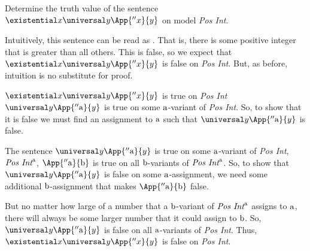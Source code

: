 \begin{majorILnc}{}
	Determine the truth value of the sentence $\existential\variable{x}\universal\variable{y}\App{''\variable{x}}{\variable{y}}$ on model \emph{Pos Int}.
\end{majorILnc}
\begin{PROOF}
	Intuitively, this sentence can be read as .
	That is, there is some positive integer that is greater than all others.
	This is false, so we expect that $\existential\variable{x}\universal\variable{y}\App{''\variable{x}}{\variable{y}}$ is false on \emph{Pos Int}.
	But, as before, intuition is no substitute for proof.

	$\existential\variable{x}\universal\variable{y}\App{''\variable{x}}{\variable{y}}$ is true on \emph{Pos Int} \Iff $\universal\variable{y}\App{''\constant{a}}{\variable{y}}$ is true on some $\mathrm{a}$-variant of \emph{Pos Int}. 
	So, to show that it is false we must find an assignment to $\mathrm{a}$ such that $\universal\variable{y}\App{''\constant{a}}{\variable{y}}$ is false.

	The sentence $\universal\variable{y}\App{''\constant{a}}{\variable{y}}$ is true on some $\mathrm{a}$-variant of \emph{Pos Int}, $\emph{Pos Int}^{\mathrm{a}}$, \Iff $\App{''\constant{a}}{\constant{b}}$ is true on all $\mathrm{b}$-variants of $\emph{Pos Int}^{\mathrm{a}}$.
	So, to show that $\universal\variable{y}\App{''\constant{a}}{\variable{y}}$ is false on some $\mathrm{a}$-assignment, we need some additional $\mathrm{b}$-assignment that makes $\App{''\constant{a}}{\constant{b}}$ false.

	But no matter how large of a number that a $\mathrm{b}$-variant of $\emph{Pos Int}^{\mathrm{a}}$ assigns to $\mathrm{a}$, there will always be some larger number that it could assign to $\mathrm{b}$. 
	So, $\universal\variable{y}\App{''\constant{a}}{\variable{y}}$ is false on all $\mathrm{a}$-variants of \emph{Pos Int}. 
	Thus, $\existential\variable{x}\universal\variable{y}\App{''\variable{x}}{\variable{y}}$ is false on \emph{Pos Int}.
\end{PROOF}

